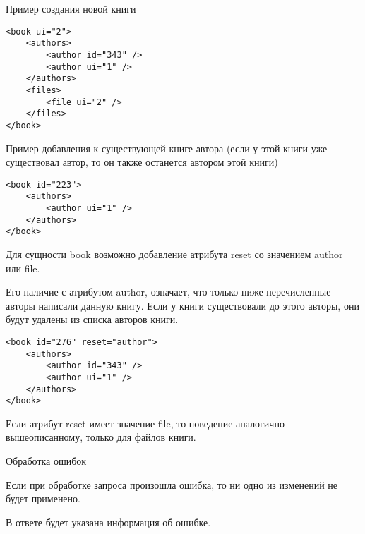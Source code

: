 Пример создания новой книги 
\lstset{language=XML}
\begin{lstlisting}
<book ui="2">
    <authors>
        <author id="343" />
        <author ui="1" />
    </authors>
    <files>
        <file ui="2" />
    </files>
</book>
\end{lstlisting}

Пример добавления к существующей книге автора (если у этой книги уже существовал автор, то он также останется автором этой книги) 
\lstset{language=XML}
\begin{lstlisting}
<book id="223">
    <authors>
        <author ui="1" />
    </authors>
</book>
\end{lstlisting}

Для сущности book возможно добавление атрибута reset со значением author или file. 

Его наличие с атрибутом author, означает, что только ниже перечисленные авторы написали данную книгу. Если у книги существовали до этого авторы, они будут удалены из списка авторов книги. 
\lstset{language=XML}
\begin{lstlisting}
<book id="276" reset="author">
    <authors>
        <author id="343" />
        <author ui="1" />
    </authors>
</book>
\end{lstlisting}

Если атрибут reset имеет значение file, то поведение аналогично вышеописанному, только для файлов книги. 

Обработка ошибок

Если при обработке запроса произошла ошибка, то ни одно из изменений не будет применено. 

В ответе будет указана информация об ошибке.
